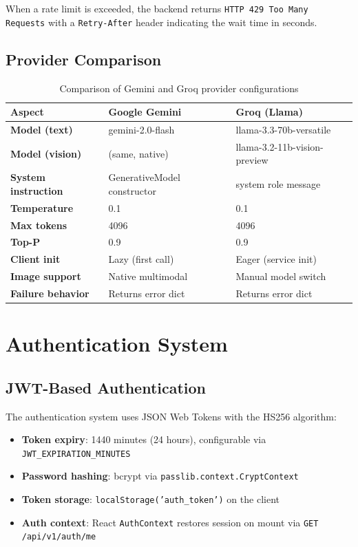 \documentclass[11pt,a4paper]{article}
\begin{document}
When a rate limit is exceeded, the backend returns \texttt{HTTP 429 Too Many Requests} with a \texttt{Retry-After} header indicating the wait time in seconds.

\subsection{Provider Comparison}

\begin{table}[H]
\centering
\begin{tabular}{@{}lll@{}}
\toprule
\textbf{Aspect} & \textbf{Google Gemini} & \textbf{Groq (Llama)} \\
\midrule
\textbf{Model (text)} & gemini-2.0-flash & llama-3.3-70b-versatile \\
\textbf{Model (vision)} & (same, native) & llama-3.2-11b-vision-preview \\
\textbf{System instruction} & GenerativeModel constructor & system role message \\
\textbf{Temperature} & 0.1 & 0.1 \\
\textbf{Max tokens} & 4096 & 4096 \\
\textbf{Top-P} & 0.9 & 0.9 \\
\textbf{Client init} & Lazy (first call) & Eager (service init) \\
\textbf{Image support} & Native multimodal & Manual model switch \\
\textbf{Failure behavior} & Returns error dict & Returns error dict \\
\bottomrule
\end{tabular}
\caption{Comparison of Gemini and Groq provider configurations}
\end{table}
\clearpage

\section{Authentication System}

\subsection{JWT-Based Authentication}

The authentication system uses JSON Web Tokens with the HS256 algorithm:

\begin{itemize}
    \item \textbf{Token expiry}: 1440 minutes (24 hours), configurable via \texttt{JWT\_EXPIRATION\_MINUTES}
    \item \textbf{Password hashing}: bcrypt via \texttt{passlib.context.CryptContext}
    \item \textbf{Token storage}: \texttt{localStorage('auth\_token')} on the client
    \item \textbf{Auth context}: React \texttt{AuthContext} restores session on mount via \texttt{GET /api/v1/auth/me}
\end{itemize}
\end{document}
